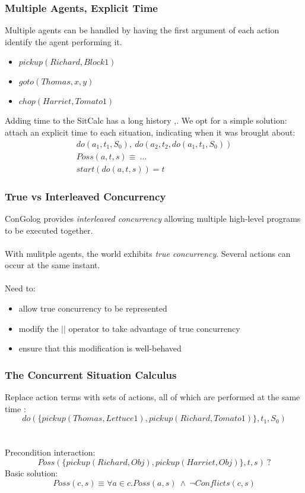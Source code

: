 \documentclass{beamer}
\begin{document}
\begin{frame}
\frametitle{Multiple Agents, Explicit Time}
Multiple agents can be handled by having the first argument of each action
identify the agent performing it.
\begin{itemize}
  \item $pickup(Richard,Block1)$
  \item $goto(Thomas,x,y)$
  \item $chop(Harriet,Tomato1)$
\end{itemize}
\pause
Adding time to the SitCalc has a long history \cite{pinto94temporal},\cite{reiter96sc_nat_conc}.
We opt for a simple solution: attach an explicit time to each situation,
indicating when it was brought about:\[
\begin{array}{c}
do(a_1,t_1,S_0),\ do(a_2,t_2,do(a_1,t_1,S_0))\\
Poss(a,t,s) \equiv\ \dots\\
start(do(a,t,s)) = t
\end{array}\]
\end{frame}

\begin{frame}
\frametitle{True vs Interleaved Concurrency}
ConGolog provides \emph{interleaved concurrency} allowing multiple
high-level programs to be executed together.\\
\ \\
With mulitple agents, the world exhibits \emph{true concurrency}. Several
actions can occur at the same instant.\\
\ \\
\pause
Need to:
\begin{itemize}
  \item allow true concurrency to be represented
  \item modify the $||$ operator to take advantage of true concurrency
  \item ensure that this modification is well-behaved
\end{itemize}
\end{frame}

\begin{frame}
\frametitle{The Concurrent Situation Calculus}
Replace action terms with sets of actions, all of which are performed
at the same time \cite{reiter96sc_nat_conc}:\[
do(\{pickup(Thomas,Lettuce1),pickup(Richard,Tomato1)\},t_1,S_0)\]
\pause
\ \\
\ \\
Precondition interaction:\[
Poss(\{pickup(Richard,Obj),pickup(Harriet,Obj)\},t,s)\ ?\]
\pause
Basic solution:\[
Poss(c,s) \equiv \forall a \in c.Poss(a,s)\ \wedge\ \neg Conflicts(c,s)\]
\end{frame}
\end{document}
